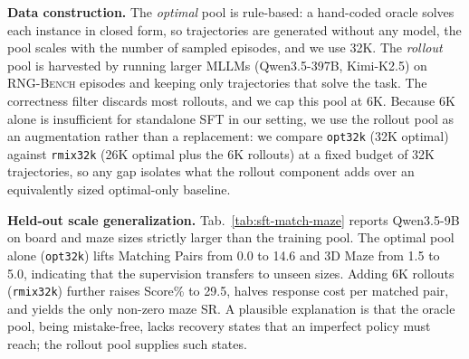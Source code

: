 \documentclass{llmxive}
\providecommand{\benchname}{\textsc{RNG-Bench}\xspace}
\providecommand{\paragraph}[1]{\vspace{1mm}\noindent\textbf{#1}}
\begin{document}
\noindent \textbf{Data construction.}
The \emph{optimal} pool is rule-based: a hand-coded oracle solves each instance in closed form, so trajectories are generated without any model, the pool scales with the number of sampled episodes, and we use 32K. The \emph{rollout} pool is harvested by running larger MLLMs (Qwen3.5-397B, Kimi-K2.5) on \benchname{} episodes and keeping only trajectories that solve the task. The correctness filter discards most rollouts, and we cap this pool at 6K. Because 6K alone is insufficient for standalone SFT in our setting, we use the rollout pool as an augmentation rather than a replacement: we compare \texttt{opt32k} (32K optimal) against \texttt{rmix32k} (26K optimal plus the 6K rollouts) at a fixed budget of 32K trajectories, so any gap isolates what the rollout component adds over an equivalently sized optimal-only baseline.

\paragraph{Held-out scale generalization.}
Tab.~\ref{tab:sft-match-maze} reports Qwen3.5-9B on board and maze sizes strictly larger than the training pool. The optimal pool alone (\texttt{opt32k}) lifts Matching Pairs from 0.0 to 14.6 and 3D Maze from 1.5 to 5.0, indicating that the supervision transfers to unseen sizes. Adding 6K rollouts (\texttt{rmix32k}) further raises Score\% to 29.5, halves response cost per matched pair, and yields the only non-zero maze SR. A plausible explanation is that the oracle pool, being mistake-free, lacks recovery states that an imperfect policy must reach; the rollout pool supplies such states.
\end{document}
